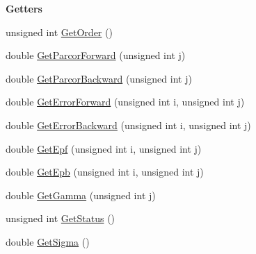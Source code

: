 \begin{Indent}\textbf{ Getters}\par
\begin{DoxyCompactItemize}
\item 
unsigned int \hyperlink{classtsa_1_1_l_s_l_learning_ae442a68a9f2f455d86ce56342288381c}{Get\+Order} ()
\item 
double \hyperlink{classtsa_1_1_l_s_l_learning_acc051c6ae5281e916083fb80a21779e8}{Get\+Parcor\+Forward} (unsigned int j)
\item 
double \hyperlink{classtsa_1_1_l_s_l_learning_a276e9d2206da6c6ac89cdca1cd6c4560}{Get\+Parcor\+Backward} (unsigned int j)
\item 
double \hyperlink{classtsa_1_1_l_s_l_learning_ae012adf2bd5b2540f1a757113968a0d4}{Get\+Error\+Forward} (unsigned int i, unsigned int j)
\item 
double \hyperlink{classtsa_1_1_l_s_l_learning_af7f7b4d2830f2bdd66ab8210ef104480}{Get\+Error\+Backward} (unsigned int i, unsigned int j)
\item 
double \hyperlink{classtsa_1_1_l_s_l_learning_adaca2870907d65690fcaec01f4d96c95}{Get\+Epf} (unsigned int i, unsigned int j)
\item 
double \hyperlink{classtsa_1_1_l_s_l_learning_ad05ee328f1a40de4fc73bd9770ae08c2}{Get\+Epb} (unsigned int i, unsigned int j)
\item 
double \hyperlink{classtsa_1_1_l_s_l_learning_a41c8d09f732ae6fed7edaed61cd73ca2}{Get\+Gamma} (unsigned int j)
\item 
unsigned int \hyperlink{classtsa_1_1_l_s_l_learning_a03684c0760835f7cc8460561ea183f7e}{Get\+Status} ()
\item 
double \hyperlink{classtsa_1_1_l_s_l_learning_ac6f60dc86d296c35cba1582472d11d27}{Get\+Sigma} ()
\end{DoxyCompactItemize}
\end{Indent}
